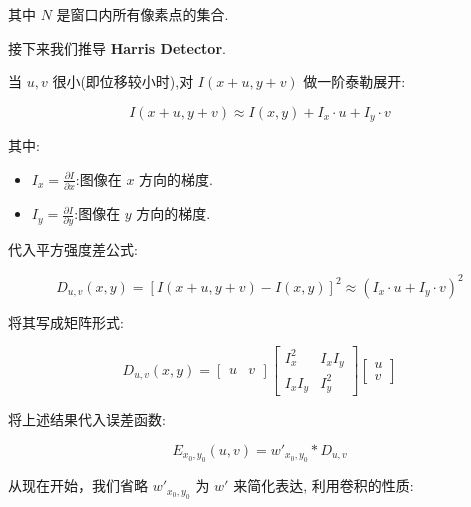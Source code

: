 其中 $N$ 是窗口内所有像素点的集合.

\vspace{1em}

接下来我们推导 \textbf{Harris Detector}.

当 $u, v$ 很小(即位移较小时),对 $I(x + u, y + v)$ 做一阶泰勒展开:

\begin{equation}
    I(x + u, y + v) \approx I(x, y) + I_x \cdot u + I_y \cdot v
\end{equation}

其中:
\begin{itemize}
    \item $I_x = \frac{\partial I}{\partial x}$:图像在 $x$ 方向的梯度.
    \item $I_y = \frac{\partial I}{\partial y}$:图像在 $y$ 方向的梯度.
\end{itemize}

代入平方强度差公式:

\begin{equation}
    D_{u,v}(x, y) = \left[I(x + u, y + v) - I(x, y)\right]^2
    \approx \left(I_x \cdot u + I_y \cdot v\right)^2
\end{equation}

将其写成矩阵形式:

\begin{equation}
    D_{u,v}(x, y) =
    \begin{bmatrix}
        u & v
    \end{bmatrix}
    \begin{bmatrix}
        I_x^2 & I_x I_y \\
        I_x I_y & I_y^2
    \end{bmatrix}
    \begin{bmatrix}
        u \\
        v
    \end{bmatrix}
\end{equation}

将上述结果代入误差函数:

\begin{equation}
    E_{x_0, y_0}(u, v) = w'_{x_0, y_0} * D_{u,v}
\end{equation}

从现在开始，我们省略 $w'_{x_0, y_0}$ 为 $w'$ 来简化表达, 利用卷积的性质:

